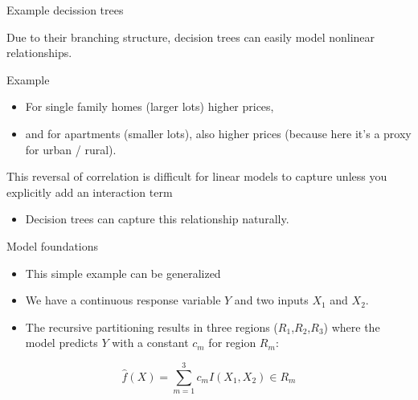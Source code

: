 \documentclass[
  10pt,
  ignorenonframetext,
]{beamer}
\providecommand{\tightlist}{%
  \setlength{\itemsep}{0pt}\setlength{\parskip}{0pt}}
\begin{document}
\begin{frame}{Example decission trees}
\protect\hypertarget{example-decission-trees}{}

Due to their branching structure, decision trees can easily model
nonlinear relationships.

\begin{block}{Example}

\begin{itemize}
\tightlist
\item
  For single family homes (larger lots) higher prices,
\item
  and for apartments (smaller lots), also higher prices (because here
  it's a proxy for urban / rural).
\end{itemize}

This reversal of correlation is difficult for linear models to capture
unless you explicitly add an interaction term

\begin{itemize}
\tightlist
\item
  Decision trees can capture this relationship naturally.
\end{itemize}

\end{block}

\end{frame}

\begin{frame}{Model foundations}
\protect\hypertarget{model-foundations}{}

\begin{itemize}
\tightlist
\item
  This simple example can be generalized
\item
  We have a continuous response variable \(Y\) and two inputs \(X_1\)
  and \(X_2\).
\item
  The recursive partitioning results in three regions
  (\(R_1\),\(R_2\),\(R_3\)) where the model predicts \(Y\) with a
  constant \(c_m\) for region \(R_m\):
\end{itemize}

\[
\hat{f} (X) = \sum\limits_{m=1}^3c_mI(X_1,X_2)\in R_m
\]

\end{frame}
\end{document}
